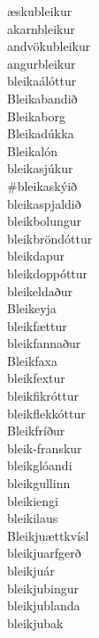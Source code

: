 \documentclass[../samsetningasafn.tex]{subfiles}
\begin{document}
\begin{bigwordlist}

\begin{center}
\begin{footnotesize}
\begin{multicols}{4}
	\begin{description}
		\item [æskubleikur]
		\item [akarnbleikur]
		\item [andvökubleikur]
		\item [angurbleikur]
		\item [bleikaálóttur]
		\item [Bleikabandið]
		\item [Bleikaborg]
		\item [Bleikadúkka]
		\item [Bleikalón]
		\item [bleikasjúkur]
		\item [\#bleikaskýið]
		\item [bleikaspjaldið]
		\item [bleikbolungur]
		\item [bleikbröndóttur]
		\item [bleikdapur]
		\item [bleikdoppóttur]
		\item [bleikeldaður]
		\item [Bleikeyja]
		\item [bleikfættur]
		\item [bleikfannaður]
		\item [Bleikfaxa]
		\item [bleikfextur]
		\item [bleikfikróttur]
		\item [bleikflekkóttur]
		\item [Bleikfríður]
		\item [bleik-franskur]
		\item [bleikglóandi]
		\item [bleikgullinn]
		\item [bleikiengi]
		\item [bleikilaus]
		\item [Bleikjuættkvísl]
		\item [bleikjuarfgerð]
		\item [bleikjuár]
		\item [bleikjubingur]
		\item [bleikjublanda]
		\item [bleikjubak]

\end{description}
\end{multicols}
\end{footnotesize}
\end{center}
\end{bigwordlist}
\end{document}
